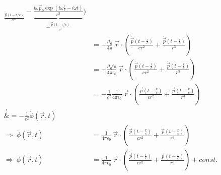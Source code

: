 \documentclass[11pt a4paper]{article}
\newcommand{\epsz}{\epsilon_0}
\begin{document}
\begin{align*}
		 _{\frac{\ddot{\vec p}(t - r/c)}{cr^2}}
		 - \underbrace{\frac{i \omega \vec p_0 \exp\left(i\omega\frac rc - i\omega t\right)}{r^3}}
		 _{- \frac{\dot{\vec p}(t - r/c)}{r^3}}
		\Bigg) \\
	&= 
		- \frac{\mu_0}{4\pi}  \ \vec r \cdot 
		\left(
			\frac{\ddot{\vec p} \left(t - \frac rc \right)}{cr^2} 
			+ \frac{\dot{\vec p}\left( t - \frac rc \right)}{r^3}
		\right) \\
	&= 
		- \frac{\mu_0\epsz}{4\pi\epsz}  \ \vec r \cdot 
		\left(
			\frac{\ddot{\vec p} \left(t - \frac rc \right)}{cr^2} 
			+ \frac{\dot{\vec p}\left( t - \frac rc \right)}{r^3}
		\right) \\
	&= 
		- \frac{1}{c^2} \frac{1}{4\pi\epsz}  \ \vec r \cdot 
		\left(
			\frac{\ddot{\vec p} \left(t - \frac rc \right)}{cr^2} 
			+ \frac{\dot{\vec p}\left( t - \frac rc \right)}{r^3}
		\right) \\
	\overset{!}&{=} - \frac{1}{c^2} \dot \phi(\vec r, t) \\
	\Rightarrow \
	\dot \phi(\vec r, t)
	&= 
		\frac{1}{4\pi\epsz}  \ \vec r \cdot 
		\left(
			\frac{\ddot{\vec p} \left(t - \frac rc \right)}{cr^2} 
			+ \frac{\dot{\vec p}\left( t - \frac rc \right)}{r^3}
		\right) \\
	\Rightarrow \
	\phi(\vec r, t)
	&= 
		\frac{1}{4\pi\epsz}  \ \vec r \cdot 
		\left(
			\frac{\dot{\vec p} \left(t - \frac rc \right)}{cr^2} 
			+ \frac{\vec p\left( t - \frac rc \right)}{r^3}
		\right) + const.
\end{align*}
\end{document}

